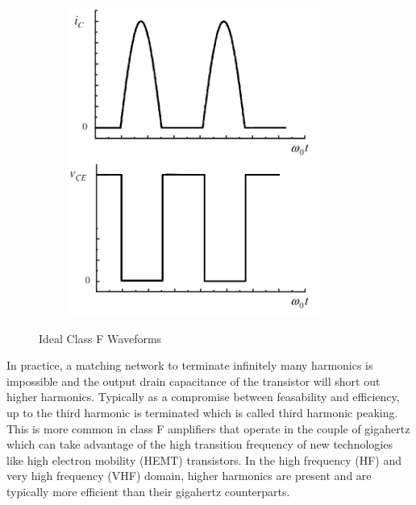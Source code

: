 \begin{figure}
  \centering
  \includegraphics[width=4in,height=4in,keepaspectratio]{figures/detail/classf_wave}\\
  \caption{Ideal Class F Waveforms \cite{Rudiakova2006}}
  \label{fig:classf_wave}
\end{figure}



In practice, a matching network to terminate infinitely many harmonics is impossible and the output drain capacitance of the transistor will short out higher harmonics. Typically as a compromise between feasability and efficiency, up to the third harmonic is terminated which is called third harmonic peaking. This is more common in class F amplifiers that operate in the couple of gigahertz which can take advantage of the high transition frequency of new technologies like high electron mobility (HEMT) transistors. In the high frequency (HF) and very high frequency (VHF) domain, higher harmonics are present and are typically more efficient than their gigahertz counterparts.

